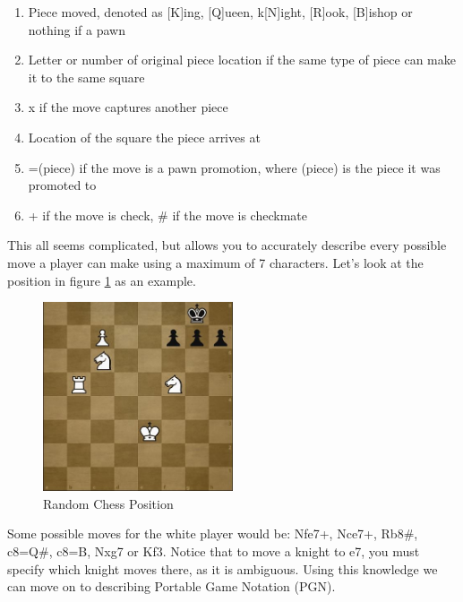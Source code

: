 \documentclass[12pt]{article}
\begin{document}
    \begin{enumerate}
        \item Piece moved, denoted as [K]ing, [Q]ueen, k[N]ight, [R]ook, [B]ishop or nothing if a pawn
        \item Letter or number of original piece location if the same type of piece can make it to the same square
        \item x if the move captures another piece 
        \item Location of the square the piece arrives at 
        \item =(piece) if the move is a pawn promotion, where (piece) is the piece it was promoted to
        \item + if the move is check, \# if the move is checkmate 
    \end{enumerate}

    This all seems complicated, but allows you to accurately describe every possible move a player can make using a maximum of 7 characters. Let's look at the position in figure \ref{fig:chess_position} as an example. 

    \begin{singlespace}
        \begin{figure}[ht]
            \centering
            \caption{Random Chess Position}
            \label{fig:chess_position}
            \includegraphics[width=0.5\textwidth]{random_position.jpg}
        \end{figure}
    \end{singlespace}

    Some possible moves for the white player would be: Nfe7+, Nce7+, Rb8\#, c8=Q\#, c8=B, Nxg7 or Kf3. Notice that to move a knight to e7, you must specify which knight moves there, as it is ambiguous. Using this knowledge we can move on to describing Portable Game Notation (PGN).
\end{document}
